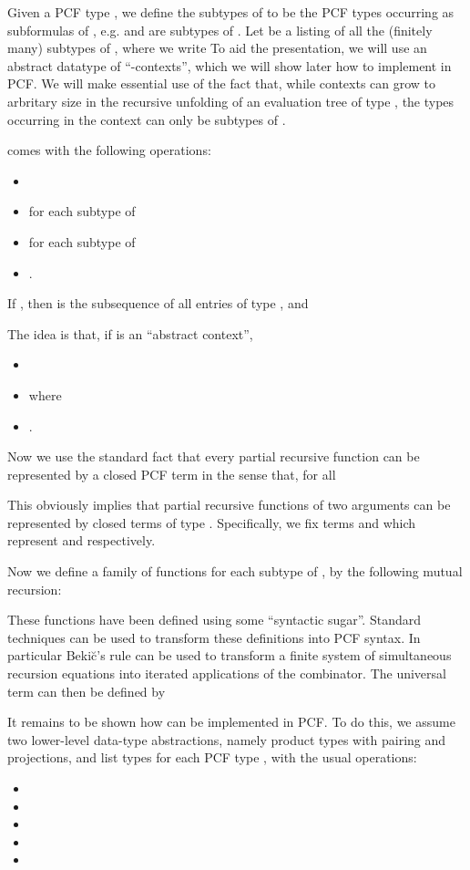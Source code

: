 \documentclass[11pt]{article}
\begin{document}
Given a PCF type , we define the subtypes of  to be the PCF
types occurring as subformulas of , e.g.  and
 are subtypes of . Let
 be a listing of all the (finitely many) subtypes
of , where we write  To aid the presentation, we will use an
abstract datatype  of ``-contexts'', which we
will show later how to implement in PCF. We will make essential
use of the fact that, while contexts can grow to arbritary size in
the recursive unfolding of an evaluation tree of type , the
types occurring in the context can only be subtypes of .

 comes with the following operations:
\begin{itemize}
\item 
\item  for each subtype
 of 
\item  for each subtype  of 
\item .
\end{itemize}

If , then  is the subsequence of all
entries of type ,  and 

The idea is that, if  is an ``abstract context'',
\begin{itemize}
\item 
\item  where 
\item .
\end{itemize}

Now we use the standard fact that every partial recursive function
 can be represented by a closed PCF term
 in the sense that, for all 

This obviously implies that partial recursive functions of two arguments can
be represented by closed terms of type .
Specifically, we fix terms  and
 which represent  and 
respectively.

Now we define a family of functions  for each subtype  of , by the following mutual recursion:



These functions have been defined using some ``syntactic sugar''.
Standard techniques can be used to transform these definitions
into PCF syntax. In particular Beki\u{c}'s rule
\cite{WinskelG:fspl} can be used to transform a finite system of
simultaneous recursion equations into iterated applications of the
 combinator. The universal term  can then be defined
by 

It remains to be shown how  can be implemented in PCF. To do
this, we assume two lower-level data-type abstractions, namely product
types  with pairing and projections, and list types 
for each PCF type , with the usual operations:
\begin{itemize}
\item 
\item 
\item 
\item 
\item 
\end{itemize}
\end{document}
